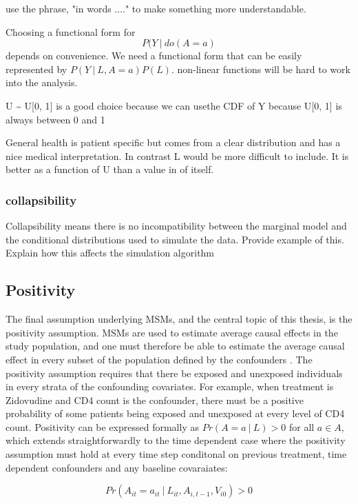 \documentclass[11pt]{article}
\begin{document}
use the phrase, "in words ...." to make something more understandable.

Choosing a functional form for \[P(Y\ |\ do(A=a)\] depends on
convenience. We need a functional form that can be easily represented by
\(P(Y\ |\ L, A=a)P(L)\). non-linear functions will be hard to work into
the analysis.

U \textasciitilde{} U{[}0, 1{]} is a good choice because we can usethe
CDF of Y because U{[}0, 1{]} is always between 0 and 1

General health is patient specific but comes from a clear distribution
and has a nice medical interpretation. In contrast L would be more
difficult to include. It is better as a function of U than a value in of
itself.

\subsubsection{collapsibility}\label{collapsibility}

Collapsibility means there is no incompatibility between the marginal
model and the conditional distributions used to simulate the data.
Provide example of this. Explain how this affects the simulation
algorithm

    \subsection{Positivity}\label{positivity}

The final assumption underlying MSMs, and the central topic of this
thesis, is the positivity assumption. MSMs are used to estimate average
causal effects in the study population, and one must therefore be able
to estimate the average causal effect in every subset of the population
defined by the confounders \citet{Cole2008}. The positivity assumption
requires that there be exposed and unexposed individuals in every strata
of the confounding covariates. For example, when treatment is Zidovudine
and CD4 count is the confounder, there must be a positive probability of
some patients being exposed and unexposed at every level of CD4 count.
Positivity can be expressed formally as \(Pr(A=a\ |\ L) > 0\) for all
\(a \in A\), which extends straightforwardly to the time dependent case
where the positivity assumption must hold at every time step conditonal
on previous treatment, time dependent confounders and any baseline
covaraiates:

\[Pr(A_{it}=a_{it}\ |\ L_{it}, A_{i, t-1}, V_{i0}) > 0\]
\end{document}
